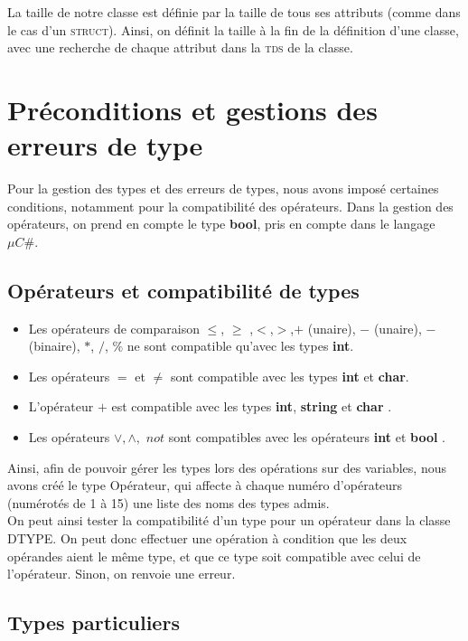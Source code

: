 \documentclass[11pt,a4paper]{report}
\begin{document}
La taille de notre classe est définie par la taille de tous ses attributs (comme dans le cas d'un \textsc{struct}). Ainsi, on définit la taille à la fin de la définition d'une classe, avec une recherche de chaque attribut dans la \textsc{tds} de la classe.





\section{Préconditions et gestions des erreurs de type}

Pour la gestion des types et des erreurs de types, nous avons imposé certaines conditions, notamment pour la compatibilité des opérateurs. Dans la gestion des opérateurs, on prend en compte le type {\bf bool}, pris en compte dans le langage $\mu C \#$.


\subsection{Opérateurs et compatibilité de types}

\begin{itemize}
\item Les opérateurs de comparaison $\leq$, $\geq$ ,$<$,$>$,$+$ (unaire), $-$ (unaire), $-$ (binaire), $*$, $/$, $\%$ ne sont compatible qu'avec les types \textbf{ int}.
\item Les opérateurs $=$ et $\neq$  sont compatible avec les types {\bf int} et {\bf char}.
\item L'opérateur $+$ est compatible avec les types {\bf int}, {\bf string } et {\bf char }.
\item Les opérateurs $\vee,\wedge,$ $not$ sont compatibles avec les opérateurs {\bf int } et {\bf bool }.
\end{itemize}

Ainsi, afin de pouvoir gérer les types lors des opérations sur des variables, nous avons créé le type Opérateur, qui affecte à chaque numéro d'opérateurs (numérotés de 1 à 15) une liste des noms des types admis.\\
 On peut ainsi tester la compatibilité d'un type pour un opérateur dans la classe DTYPE. On peut donc effectuer une opération à condition que les deux opérandes aient le même type, et que ce type soit compatible avec celui de l'opérateur. Sinon, on renvoie une erreur.



\subsection{Types particuliers}
\end{document}
